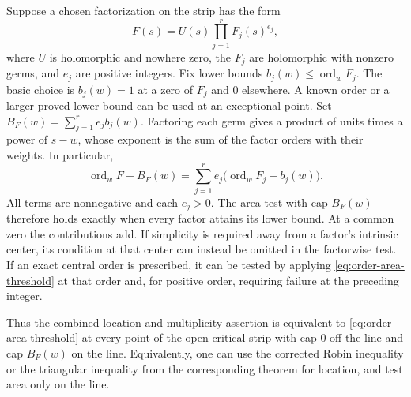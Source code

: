 \documentclass[11pt]{amsart}
\theoremstyle{definition}
\theoremstyle{remark}
\numberwithin{equation}{section}
\begin{document}
Suppose a chosen factorization on the strip has the form
\[
 F(s)=U(s)\prod_{j=1}^{r}F_j(s)^{e_j},
\]
where \(U\) is holomorphic and nowhere zero, the \(F_j\) are holomorphic
with nonzero germs, and \(e_j\) are positive integers. Fix lower bounds
\(b_j(w)\le\operatorname{ord}_w F_j\). The basic choice is \(b_j(w)=1\)
at a zero of \(F_j\) and \(0\) elsewhere. A known order or a larger
proved lower bound can be used at an exceptional point. Set
\(B_F(w)=\sum_{j=1}^{r}e_j b_j(w)\). Factoring each germ gives a
product of units times a power of \(s-w\), whose exponent is the
sum of the factor orders with their weights. In particular,
\[
 \operatorname{ord}_w F-B_F(w)
  =\sum_{j=1}^r e_j\bigl(\operatorname{ord}_w F_j-b_j(w)\bigr).
\]
All terms are nonnegative and each \(e_j>0\). The area test with
cap \(B_F(w)\) therefore holds exactly when every factor attains
its lower bound. At a common zero the contributions add.
If simplicity is required away from a factor's intrinsic center, its
condition at that center can instead be omitted in the factorwise test.
If an exact central order is prescribed, it can be tested by applying
\eqref{eq:order-area-threshold} at that order and, for positive order,
requiring failure at the preceding integer.

Thus the combined location and multiplicity assertion is equivalent to
\eqref{eq:order-area-threshold} at every point of the open critical strip
with cap \(0\) off the line and cap \(B_F(w)\) on the line. Equivalently,
one can use the corrected Robin inequality or the triangular inequality
from the corresponding theorem for location, and test area only on the
line.
\end{document}
